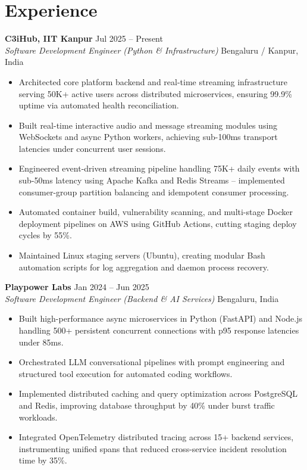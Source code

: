\documentclass[10pt]{article}
\newcommand{\rItemList}{\begin{itemize}[leftmargin=1.1em, itemsep=1.0pt, topsep=1.0pt, parsep=0pt, label=\textbullet]}
\newcommand{\rEndItemList}{\end{itemize}}
\begin{document}
\section{Experience}

\textbf{C3iHub, IIT Kanpur} \hfill Jul 2025 -- Present \\
\textit{Software Development Engineer (Python \& Infrastructure)} \hfill Bengaluru / Kanpur, India
\rItemList
\item Architected core platform backend and real-time streaming infrastructure serving 50K+ active users across distributed microservices, ensuring 99.9\% uptime via automated health reconciliation.
\item Built real-time interactive audio and message streaming modules using WebSockets and async Python workers, achieving sub-100ms transport latencies under concurrent user sessions.
\item Engineered event-driven streaming pipeline handling 75K+ daily events with sub-50ms latency using Apache Kafka and Redis Streams -- implemented consumer-group partition balancing and idempotent consumer processing.
\item Automated container build, vulnerability scanning, and multi-stage Docker deployment pipelines on AWS using GitHub Actions, cutting staging deploy cycles by 55\%.
\item Maintained Linux staging servers (Ubuntu), creating modular Bash automation scripts for log aggregation and daemon process recovery.
\rEndItemList

\textbf{Playpower Labs} \hfill Jan 2024 -- Jun 2025 \\
\textit{Software Development Engineer (Backend \& AI Services)} \hfill Bengaluru, India
\rItemList
\item Built high-performance async microservices in Python (FastAPI) and Node.js handling 500+ persistent concurrent connections with p95 response latencies under 85ms.
\item Orchestrated LLM conversational pipelines with prompt engineering and structured tool execution for automated coding workflows.
\item Implemented distributed caching and query optimization across PostgreSQL and Redis, improving database throughput by 40\% under burst traffic workloads.
\item Integrated OpenTelemetry distributed tracing across 15+ backend services, instrumenting unified spans that reduced cross-service incident resolution time by 35\%.
\rEndItemList
\end{document}
